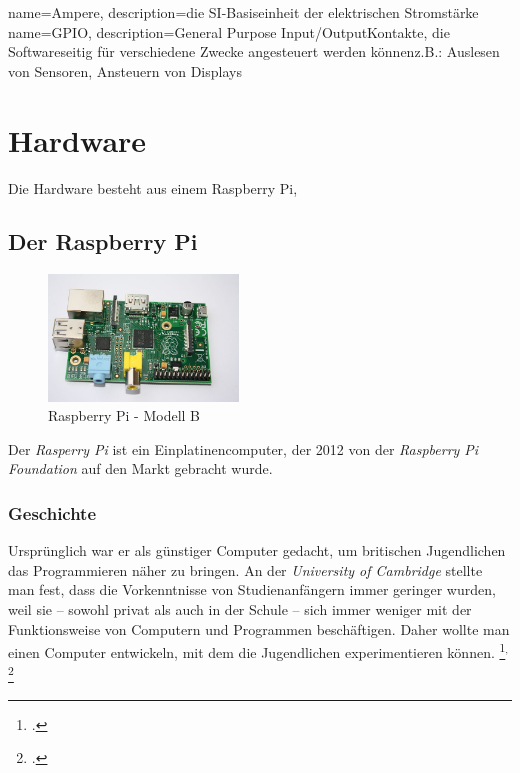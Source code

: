 {
  name=Ampere,
  description={die SI-Basiseinheit der elektrischen Stromstärke}
}
{
  name=GPIO,
  description={General Purpose Input/Output\newline Kontakte, die Softwareseitig für verschiedene Zwecke angesteuert werden können\newline z.B.: Auslesen von Sensoren, Ansteuern von Displays}
}


\chapter{Hardware}

Die Hardware besteht aus einem Raspberry Pi, 
\section{Der Raspberry Pi}
\begin{figure}
 \vspace{-16pt}
 \centering 
 \includegraphics[width=0.45\textwidth]{figures/raspberry.jpg}
 \caption[Raspberry Pi - Modell B]{Raspberry Pi - Modell B\footnotemark}
 \vspace{-50pt}
\end{figure}
Der \textit{Rasperry Pi} ist ein Einplatinencomputer, der 2012 von der  \textit{Raspberry Pi Foundation} auf den Markt gebracht wurde. 
\subsection{Geschichte}
Ursprünglich war er als günstiger Computer gedacht, um britischen Jugendlichen das Programmieren näher zu bringen. An der \textit{University of Cambridge} stellte man fest, dass die Vorkenntnisse von Studienanfängern immer geringer wurden, weil sie -- sowohl privat als auch in der Schule -- sich immer weniger mit der Funktionsweise von Computern und Programmen beschäftigen. Daher wollte man einen Computer entwickeln, mit dem die Jugendlichen experimentieren können.
\footcite{aboutraspberry}$^,$
\footcite{wiki:raspi_geschichte}


